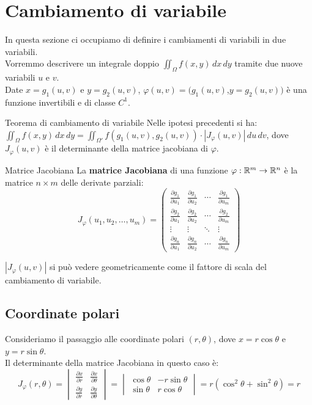 \section{Cambiamento di variabile}
In questa sezione ci occupiamo di definire i cambiamenti di variabili in due variabili.\\
Vorremmo descrivere un integrale doppio $\iint_{\Omega} f(x,y) \, dx \, dy$ tramite due nuove variabili $u$ e $v$.\\
Date $x = g_1(u,v)$ e $y = g_2(u,v)$, $\varphi(u,v)=(g_1(u,v)$,$y = g_2(u,v))$ è una funzione invertibili e di classe $C^1$.

\begin{teorema}{Teorema di cambiamento di variabile}
  Nelle ipotesi precedenti si ha: $\iint_{\Omega} f(x,y) \, dx \, dy = \iint_{\Omega'} f(g_1(u,v),g_2(u,v)) \cdot |J_{\varphi}(u,v)| \, du \, dv$, dove $J_{\varphi}(u,v)$ è il determinante della matrice jacobiana di $\varphi$.
\end{teorema}

\begin{definizione}{Matrice Jacobiana}
  La \textbf{matrice Jacobiana} di una funzione $\varphi: \mathbb{R}^m \rightarrow \mathbb{R}^n$ è la matrice $n \times m$ delle derivate parziali:
  \[
  J_{\varphi}(u_1, u_2, \ldots, u_m) = \begin{pmatrix}
  \frac{\partial g_1}{\partial u_1} & \frac{\partial g_1}{\partial u_2} & \cdots & \frac{\partial g_1}{\partial u_m} \\
  \frac{\partial g_2}{\partial u_1} & \frac{\partial g_2}{\partial u_2} & \cdots & \frac{\partial g_2}{\partial u_m} \\
  \vdots & \vdots & \ddots & \vdots \\
  \frac{\partial g_n}{\partial u_1} & \frac{\partial g_n}{\partial u_2} & \cdots & \frac{\partial g_n}{\partial u_m}
  \end{pmatrix}
  \]
\end{definizione}

\begin{osservazione}{}
  $|J_{\varphi}(u,v)|$ si può vedere geometricamente come il fattore di scala del cambiamento di variabile.
\end{osservazione}

\subsection{Coordinate polari}
Consideriamo il passaggio alle coordinate polari $(r, \theta)$, dove $x = r \cos \theta$ e $y = r \sin \theta$.\\
Il determinante della matrice Jacobiana in questo caso è:
\[
J_{\varphi}(r,\theta) = \begin{vmatrix}
\frac{\partial x}{\partial r} & \frac{\partial x}{\partial \theta} \\
\frac{\partial y}{\partial r} & \frac{\partial y}{\partial \theta}
\end{vmatrix} = \begin{vmatrix}
\cos \theta & -r \sin \theta \\
\sin \theta & r \cos \theta
\end{vmatrix} = r (\cos^2 \theta + \sin^2 \theta) = r
\]

